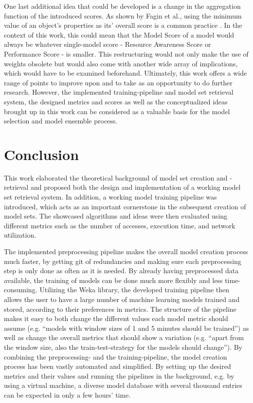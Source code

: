 One last additional idea that could be developed is a change in the aggregation function of the introduced scores. As shown by Fagin et al., using the minimum value of an object's properties as its’ overall score is a common practice \cite{fagin2002}. In the context of this work, this could mean that the Model Score of a model would always be whatever single-model score - Resource Awareness Score or Performance Score - is smaller. This restructuring would not only make the use of weights obsolete but would also come with another wide array of implications, which would have to be examined beforehand. Ultimately, this work offers a wide range of points to improve upon and to take as an opportunity to do further research. However, the implemented training-pipeline and model set retrieval system, the designed metrics and scores as well as the conceptualized ideas brought up in this work can be considered as a valuable basis for the model selection and model ensemble process.




\section{Conclusion}

This work elaborated the theoretical background of model set creation and -retrieval and proposed both the design and implementation of a working model set retrieval system. In addition, a working model training pipeline was introduced, which acts as an important cornerstone in the subsequent creation of model sets. The showcased algorithms and ideas were then evaluated using different metrics such as the number of accesses, execution time, and network utilization.

The implemented preprocessing pipeline makes the overall model creation process much faster, by getting git of redundancies and making sure each preprocessing step is only done as often as it is needed. By already having preprocessed data available, the training of models can be done much more flexibly and less time-consuming. Utilizing the Weka library, the developed training pipeline then allows the user to have a large number of machine learning models trained and stored, according to their preferences in metrics. The structure of the pipeline makes it easy to both change the different values each model metric should assume (e.g. “models with window sizes of 1 and 5 minutes should be trained”) as well as change the overall metrics that should show a variation (e.g. “apart from the window size, also the train-test-strategy for the models should change”). By combining the preprocessing- and the training-pipeline, the model creation process has been vastly automated and simplified. By setting up the desired metrics and their values and running the pipelines in the background, e.g. by using a virtual machine, a diverse model database with several thousand entries can be expected in only a few hours’ time.

